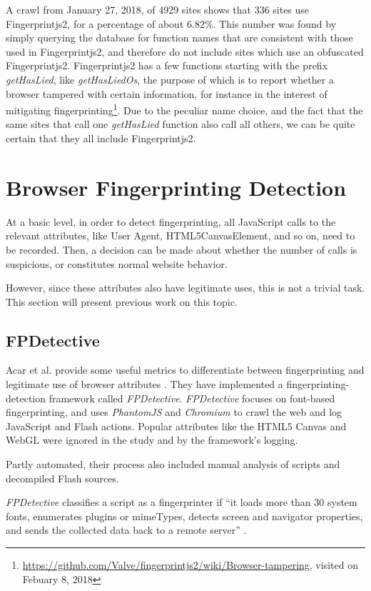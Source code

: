 \documentclass[
    fontsize=12pt,
    headings=small,
    parskip=half,
    bibliography=totoc,
    numbers=noenddot,
    open=any
]{scrreprt}
\begin{document}
A crawl from January 27, 2018, of 4929 sites shows that 336 sites use Fingerprintjs2, for a percentage of about 6.82\%.
This number was found by simply querying the database for function names that are consistent with
those used in Fingerprintjs2, and therefore do not include sites which use an obfuscated Fingerprintjs2.
Fingerprintjs2 has a few functions starting with the prefix \textit{getHasLied}, like \textit{getHasLiedOs}, the purpose
of which is to report whether a browser tampered with certain information, for instance in the interest of mitigating
fingerprinting\footnote{\url{https://github.com/Valve/fingerprintjs2/wiki/Browser-tampering}, visited on Febuary 8, 2018}.
Due to the peculiar name choice, and the fact that the same sites that call one \textit{getHasLied}
function also call all others, we can be quite certain that they all include Fingerprintjs2.


\section{Browser Fingerprinting Detection}
At a basic level, in order to detect fingerprinting, all JavaScript calls to the relevant attributes,
like User Agent, HTML5CanvasElement, and so on, need to be recorded. Then, a decision can be made about whether the number
of calls is suspicious, or constitutes normal website behavior.

However, since these attributes also have legitimate uses, this is not a trivial task.
This section will present previous work on this topic.


\subsection{FPDetective}
Acar et al. provide some useful metrics to differentiate between fingerprinting and legitimate use of
browser attributes \cite{DBLP:conf/ccs/AcarJNDGPP13}. They have implemented a fingerprinting-detection
framework called \textit{FPDetective}. \textit{FPDetective} focuses on font-based fingerprinting, and uses
\textit{PhantomJS} and \textit{Chromium} to crawl the web and log JavaScript and Flash actions.
Popular attributes like the HTML5 Canvas and WebGL were ignored in the study and by the framework's logging.

Partly automated, their process also included manual analysis of scripts and decompiled Flash sources.

\textit{FPDetective} classifies a script as a fingerprinter if ``it loads more than 30 system fonts, enumerates plugins
or mimeTypes, detects screen and navigator properties, and sends the collected data back to a remote server''
\cite{DBLP:conf/ccs/AcarJNDGPP13}.
\end{document}
